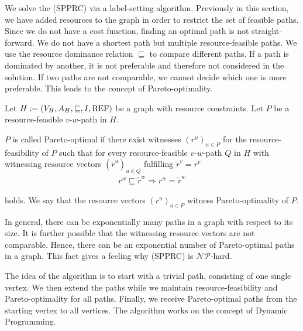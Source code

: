 We solve the (SPPRC) via a label-setting algorithm. Previously in this section, we have added resources to the graph in order to restrict the set of feasible paths. Since we do not have a cost function, finding an optimal path is not straight-forward. We do not have a shortest path but multiple resource-feasible paths. We use the resource dominance relation $\sqsubseteq$ to compare different paths. If a path is dominated by another, it is not preferable and therefore not considered in the solution. If two paths are not comparable, we cannot decide which one is more preferable. This leads to the concept of Pareto-optimality.

\begin{definition}

Let ${H:=\left(V_H,A_H,\sqsubseteq,I,\operatorname{REF}\right)}$ be a graph with resource constraints. Let $P$ be a resource-feasible $v$-$w$-path in $H$.

$P$ is called Pareto-optimal if there exist witnesses $\left(r^u\right)_{u\in P}$ for the resource-feasibility of $P$ such that for every resource-feasible $v$-$w$-path $Q$ in $H$ with witnessing resource vectors $\left(\tilde{r}^u\right)_{u\in Q}$ fulfilling ${\tilde{r}^v = r^v}$
\begin{align*}
	r^w\sqsubseteq \tilde{r}^w \Rightarrow r^w = \tilde{r}^w
\end{align*}

holds. We say that the resource vectors $\left(r^u\right)_{u\in P}$ witness Pareto-optimality of $P$.

\end{definition}

In general, there can be exponentially many paths in a graph with respect to its size. It is further possible that the witnessing resource vectors are not comparable. Hence, there can be an exponential number of Pareto-optimal paths in a graph. This fact gives a feeling why (SPPRC) is $\mathcal{NP}$-hard.

The idea of the algorithm is to start with a trivial path, consisting of one single vertex. We then extend the paths while we maintain resource-feasibility and Pareto-optimality for all paths. Finally, we receive Pareto-optimal paths from the starting vertex to all vertices. The algorithm works on the concept of Dynamic Programming.

